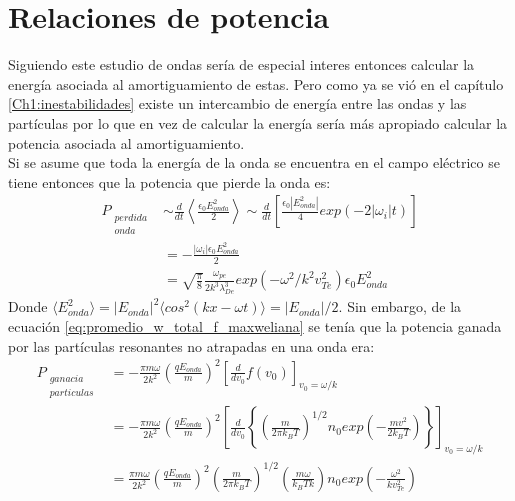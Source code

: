 \documentclass[../tesis_main_file.tex]{subfiles}
\begin{document}
\section{Relaciones de potencia}
Siguiendo este estudio de ondas sería de especial interes entonces calcular la energía asociada al amortiguamiento de estas.
Pero como ya se vió en el capítulo \ref{Ch1:inestabilidades} existe un intercambio de energía entre las ondas  y las partículas por lo que en vez de calcular la energía sería más apropiado calcular la potencia asociada al amortiguamiento.\\
Si se asume que toda la energía de la onda se encuentra en el campo eléctrico se tiene entonces que la potencia que pierde la onda es:
\begin{equation}
\label{eq:potencia_perdida-onda_Landau}
\begin{split}
P_{\substack{perdida\\onda}}&\sim\frac{d}{dt}\left\langle \frac{\epsilon_0 E^2_{onda}}{2}\right\rangle \sim \frac{d}{dt}\left[\frac{\epsilon_0|E^2_{onda}|}{4}exp(-2|\omega_i|t)\right]\\
&=-\frac{|\omega_i|\epsilon_0 E^2_{onda}}{2}\\
&=\sqrt{\frac{\pi}{8}}\frac{\omega_{pe}}{2k^3\lambda^3_{De}}exp\left(-\omega^2/k^2v^2_{Te}\right)\epsilon_0 E^2_{onda}
\end{split}
\end{equation}
Donde $\langle E^2_{onda}\rangle =|E_{onda}|^2\langle cos^2(kx-\omega t)\rangle =|E_{onda}|/2$. Sin embargo, de la ecuación \ref{eq:promedio_w_total_f_maxweliana} se tenía que la potencia ganada por las partículas resonantes no atrapadas en una onda era:
\begin{equation}
\label{eq:P_ganada_particulas_Landau}
\begin{split}
P_{\substack{ganacia\\particulas} } &=-\frac{\pi m \omega }{2k^2} \left( \frac{q E_{onda}}{m} \right) ^2 \left[ \frac{d}{dv_0}f(v_0) \right]_{v_0=\omega / k} \\
&=-\frac{\pi m \omega}{2k^2}\left( \frac{qE_{onda}}{m} \right)^2 \left[\frac{d}{dv_0} \left\lbrace \left(\frac{m}{2\pi k_BT} \right)^{1/2}n_0 exp\left( -\frac{mv^2}{2k_BT}\right) \right\rbrace \right]_{v_0= \omega /k}\\
&=\frac{\pi m \omega}{2k^2}\left(\frac{qE_{onda}}{m}\right)^2 \left( \frac{m}{2\pi k_BT} \right)^{1/2}\left( \frac{m \omega}{k_BTk}\right)n_0 exp \left(-\frac{\omega^2}{kv^2_{Te}}\right)
\end{split}
\end{equation}
\end{document}
